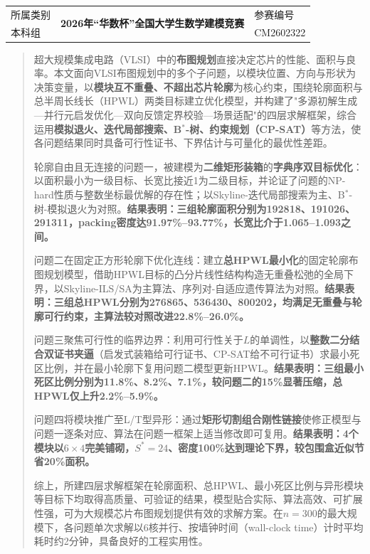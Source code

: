 \documentclass{JXUSTmodeling}
\begin{document}
	\begin{table}[]
		\centering
		\begin{tabular}{|l|c|l|}
			\hline
			\multicolumn{1}{|c|}{所属类别} & \multirow{2}{*}{\large\textbf{2026年“华数杯”全国大学生数学建模竞赛}} & 参赛编号     \\ \cline{1-1} \cline{3-3} 
			本科组            &                                                 & CM2602322 \\ \hline
		\end{tabular}
	\end{table}

\begin{abstract}
	超大规模集成电路（VLSI）中的\textbf{布图规划}直接决定芯片的性能、面积与良率。本文面向VLSI布图规划中的多个子问题，以模块位置、方向与形状为决策变量，以\textbf{模块互不重叠、不超出芯片轮廓}为核心约束，围绕轮廓面积与总半周长线长（HPWL）两类目标建立优化模型，并构建了"多源初解生成—并行元启发优化—双向反馈定界校验—场景适配"的四层求解框架，综合运用\textbf{模拟退火、迭代局部搜索、B${}^{\ast}$-树、约束规划（CP-SAT）}等方法，使各问题结果同时具备可行性证书、下界估计与可量化的最优性差距。

	轮廓自由且无连接的问题一，被建模为\textbf{二维矩形装箱}的\textbf{字典序双目标优化}：以面积最小为一级目标、长宽比接近1为二级目标，并论证了问题的NP-hard性质与整数坐标最优解的存在性；以Skyline-迭代局部搜索为主、B${}^{\ast}$-树-模拟退火为对照。\textbf{结果表明：三组轮廓面积分别为192818、191026、291311，packing密度达91.97\%--93.77\%，长宽比介于1.065--1.093之间。}

	问题二在固定正方形轮廓下优化连线：建立\textbf{总HPWL最小化}的固定轮廓布图规划模型，借助HPWL目标的凸分片线性结构构造无重叠松弛的全局下界，以Skyline-ILS/SA为主算法、序列对-自适应遗传算法为对照。\textbf{结果表明：三组总HPWL分别为276865、536430、800202，均满足无重叠与轮廓可行约束，主算法较对照改进22.8\%--26.0\%。}

	问题三聚焦可行性的临界边界：利用可行性关于$L$的单调性，以\textbf{整数二分结合双证书夹逼}（启发式装箱给可行证书、CP-SAT给不可行证书）求最小死区比例，并在最小轮廓下复用问题二模型更新HPWL。\textbf{结果表明：三组最小死区比例分别为11.8\%、8.2\%、7.1\%，较问题二的15\%显著压缩，总HPWL仅上升2.2\%--5.9\%。}

	问题四将模块推广至L/T型异形：通过\textbf{矩形切割组合刚性链接}使修正模型与问题一逐条对应、算法在问题一框架上适当修改即可复用。\textbf{结果表明：4个模块以$6\times4$完美铺砌，$S^*=24$、密度100\%达到理论下界，较包围盒近似节省20\%面积。}

	综上，所建四层求解框架在轮廓面积、总HPWL、最小死区比例与异形模块等目标下均取得高质量、可验证的结果，模型贴合实际、算法高效、可扩展性强，可为大规模芯片布图规划提供有效的求解方案。在$n=300$的最大规模下，各问题单次求解以6核并行、按墙钟时间（wall-clock time）计时平均耗时约2分钟，具备良好的工程实用性。
	


\end{abstract}
\end{document}
